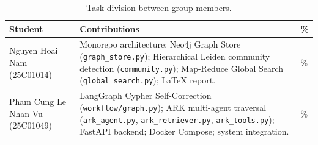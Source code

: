 \documentclass[11pt]{article}
\begin{document}
\begin{table}[h]
\centering
\small
\begin{tabularx}{\columnwidth}{>{\raggedright\arraybackslash}p{2.2cm} X >{\centering\arraybackslash}p{1cm}}
\toprule
\textbf{Student} & \textbf{Contributions} & \textbf{\%} \\
\midrule
Nguyen Hoai Nam (25C01014) &
Monorepo architecture; Neo4j Graph Store (\texttt{graph\_store.py}); Hierarchical Leiden community detection (\texttt{community.py}); Map-Reduce Global Search (\texttt{global\_search.py}); LaTeX report.
& 50\% \\
\midrule
Pham Cung Le Nhan Vu (25C01049) &
LangGraph Cypher Self-Correction (\texttt{workflow/graph.py}); ARK multi-agent traversal (\texttt{ark\_agent.py}, \texttt{ark\_retriever.py}, \texttt{ark\_tools.py}); FastAPI backend; Docker Compose; system integration.
& 50\% \\
\bottomrule
\end{tabularx}
\caption{Task division between group members.}
\label{tab:task_division}
\end{table}
\end{document}
